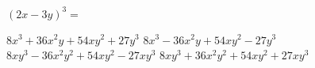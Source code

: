 
\question $(2x - 3y)^3 = $

  \begin{oneparchoices}
    \choice $8x^3 + 36x^2y + 54xy^2 + 27y^3$
    \CorrectChoice $8x^3 - 36x^2y + 54xy^2 - 27y^3$
    \choice $8xy^3 - 36x^2y^2 + 54xy^2 - 27xy^3$
    \choice $8xy^3 + 36x^2y^2 + 54xy^2 + 27xy^3$
  \end{oneparchoices}
